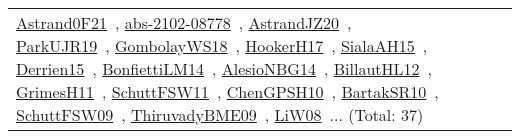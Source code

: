 {\begin{longtable}{lp{3cm}>{\raggedright\arraybackslash}p{6cm}>{\raggedright\arraybackslash}p{6cm}>{\raggedright\arraybackslash}p{8cm}}
\href{../works/Astrand0F21.pdf}{Astrand0F21}~\cite{Astrand0F21}, \href{../works/abs-2102-08778.pdf}{abs-2102-08778}~\cite{abs-2102-08778}, \href{../works/AstrandJZ20.pdf}{AstrandJZ20}~\cite{AstrandJZ20}, \href{../works/ParkUJR19.pdf}{ParkUJR19}~\cite{ParkUJR19}, \href{../works/GombolayWS18.pdf}{GombolayWS18}~\cite{GombolayWS18}, \href{../works/HookerH17.pdf}{HookerH17}~\cite{HookerH17}, \href{../works/SialaAH15.pdf}{SialaAH15}~\cite{SialaAH15}, \href{../works/Derrien15.pdf}{Derrien15}~\cite{Derrien15}, \href{../works/BonfiettiLM14.pdf}{BonfiettiLM14}~\cite{BonfiettiLM14}, \href{../works/AlesioNBG14.pdf}{AlesioNBG14}~\cite{AlesioNBG14}, \href{../works/BillautHL12.pdf}{BillautHL12}~\cite{BillautHL12}, \href{../works/GrimesH11.pdf}{GrimesH11}~\cite{GrimesH11}, \href{../works/SchuttFSW11.pdf}{SchuttFSW11}~\cite{SchuttFSW11}, \href{../works/ChenGPSH10.pdf}{ChenGPSH10}~\cite{ChenGPSH10}, \href{../works/BartakSR10.pdf}{BartakSR10}~\cite{BartakSR10}, \href{../works/SchuttFSW09.pdf}{SchuttFSW09}~\cite{SchuttFSW09}, \href{../works/ThiruvadyBME09.pdf}{ThiruvadyBME09}~\cite{ThiruvadyBME09}, \href{../works/LiW08.pdf}{LiW08}~\cite{LiW08}... (Total: 37)\\

\end{longtable}}
